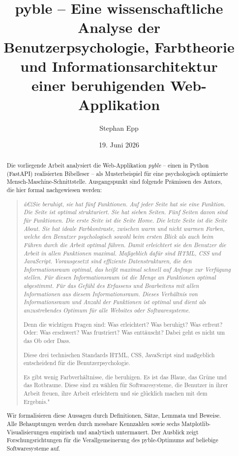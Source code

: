 ﻿\documentclass[a4paper,12pt]{article}
\title{\textbf{pyble} -- Eine wissenschaftliche Analyse der\\
Benutzerpsychologie, Farbtheorie und Informationsarchitektur\\
einer beruhigenden Web-Applikation}
\author{Stephan Epp}
\date{19. Juni 2026}
\theoremstyle{definition}
\begin{document}
\sloppy
\renewcommand{\abstractname}{Kurzfassung}
\renewcommand{\contentsname}{Inhaltsverzeichnis}
\renewcommand{\figurename}{Abbildung}
\renewcommand{\tablename}{Tabelle}
\renewcommand{\refname}{Literaturverzeichnis}

\begin{abstract}
Die vorliegende Arbeit analysiert die Web-Applikation \textit{pyble} -- einen in Python
(FastAPI) realisierten Bibelleser -- als Musterbeispiel für eine psychologisch optimierte
Mensch-Maschine-Schnittstelle. Ausgangspunkt sind folgende Prämissen des Autors, die
hier formal nachgewiesen werden:

\begin{quote}
\itshape
â€žSie beruhigt, sie hat fünf Funktionen. Auf jeder Seite hat sie eine Funktion. Die Seite
ist optimal strukturiert. Sie hat sieben Seiten. Fünf Seiten davon sind für Funktionen. Die
erste Seite ist die Seite Home. Die letzte Seite ist die Seite About. Sie hat ideale
Farbkontraste, zwischen warm und nicht warmen Farben, welche den Benutzer psychologisch
sowohl beim ersten Blick als auch beim Führen durch die Arbeit optimal führen. Damit
erleichtert sie den Benutzer die Arbeit in allen Funktionen maximal. Maßgeblich dafür sind
HTML, CSS und JavaScript. Vorausgesetzt sind effiziente Datenstrukturen, die den
Informationsraum optimal, das heißt maximal schnell auf Anfrage zur Verfügung stellen.
Für diesen Informationsraum ist die Menge an Funktionen optimal abgestimmt. Für das
Gefühl des Erfassens und Bearbeitens mit allen Informationen aus diesem Informationsraum.
Dieses Verhältnis von Informationsraum und Anzahl der Funktionen ist optimal und dient als
anzustrebendes Optimum für alle Websites oder Softwaresysteme.

Denn die wichtigen Fragen sind: Was erleichtert? Was beruhigt? Was erfreut? Oder: Was
erschwert? Was frustriert? Was enttäuscht? Dabei geht es nicht um das Ob oder Dass.

Diese drei technischen Standards HTML, CSS, JavaScript sind maßgeblich entscheidend für
die Benutzerpsychologie.

Es gibt wenig Farbverhältnisse, die beruhigen. Es ist das Blaue, das Grüne und das
Rotbraune. Diese sind zu wählen für Softwaresysteme, die Benutzer in ihrer Arbeit freuen,
ihre Arbeit erleichtern und sie glücklich machen mit dem Ergebnis."
\end{quote}

Wir formalisieren diese Aussagen durch Definitionen, Sätze, Lemmata und Beweise. Alle
Behauptungen werden durch messbare Kennzahlen sowie sechs Matplotlib-Visualisierungen
empirisch und analytisch untermauert. Der Ausblick zeigt Forschungsrichtungen für die
Verallgemeinerung des pyble-Optimums auf beliebige Softwaresysteme auf.
\end{abstract}
\end{document}
